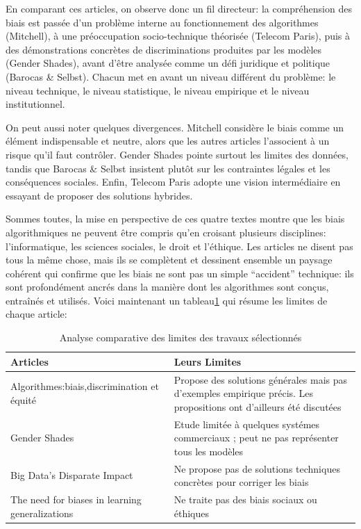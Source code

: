 \documentclass{article}
\begin{document}
En comparant ces articles, on observe donc un fil directeur: la compréhension des biais est passée d’un problème interne au fonctionnement des algorithmes (Mitchell), à une préoccupation socio-technique théorisée (Telecom Paris), puis à des démonstrations concrètes de discriminations produites par les modèles (Gender Shades), avant d’être analysée comme un défi juridique et politique (Barocas \& Selbst). Chacun met en avant un niveau différent du problème: le niveau technique, le niveau statistique, le niveau empirique et le niveau institutionnel.

On peut aussi noter quelques divergences. Mitchell considère le biais comme un élément indispensable et neutre, alors que les autres articles l’associent à un risque qu’il faut contrôler. Gender Shades pointe surtout les limites des données, tandis que Barocas \& Selbst insistent plutôt sur les contraintes légales et les conséquences sociales. Enfin, Telecom Paris adopte une vision intermédiaire en essayant de proposer des solutions hybrides.
	
Sommes toutes, la mise en perspective de ces quatre textes montre que les biais algorithmiques ne peuvent être compris qu’en croisant plusieurs disciplines: l’informatique, les sciences sociales, le droit et l’éthique. Les articles ne disent pas tous la même chose, mais ils se complètent et dessinent ensemble un paysage cohérent qui confirme que les biais ne sont pas un simple “accident” technique: ils sont profondément ancrés dans la manière dont les algorithmes sont conçus, entraînés et utilisés.
Voici maintenant un tableau\ref{tab:mon_tableau} qui résume les limites de chaque article:
\begin{table}[h]
\centering
\caption{Analyse comparative des limites des travaux sélectionnés}
\label{tab:mon_tableau}
\begin{tabular}{|p{5.5cm}|p{5.5cm}|}
\hline
Articles & Leurs Limites \\ \hline

Algorithmes:biais,discrimination et équité\cite{ageneral2023} & Propose des solutions générales mais pas d'exemples empirique précis. Les propositions ont 
d'ailleurs été discutées  \\ \hline

Gender Shades\citep{BuolamwiniG18} & Etude limitée à quelques systémes commerciaux ; peut ne pas représenter tous les modèles \\ \hline

Big Data's Disparate Impact\citep{BarocasSelbst2016} & Ne propose pas de solutions techniques concrètes pour corriger les biais \\ \hline

The need for biases in learning generalizations\citep{Mitchell1980} & Ne traite pas des biais sociaux ou éthiques \\ \hline 
\end{tabular}
\end{table}
\end{document}
